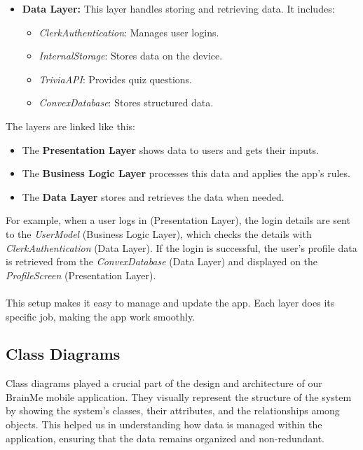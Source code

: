 \begin{itemize}
    \item \textbf{Data Layer:} This layer handles storing and retrieving data. It includes:
    \begin{itemize}
        \item \textit{ClerkAuthentication}: Manages user logins.
        \item \textit{InternalStorage}: Stores data on the device.
        \item \textit{TriviaAPI}: Provides quiz questions.
        \item \textit{ConvexDatabase}: Stores structured data.
    \end{itemize}
\end{itemize}

The layers are linked like this: 

\begin{itemize}
     
    \item The \textbf{Presentation Layer} shows data to users and gets their inputs.
    \item The \textbf{Business Logic Layer} processes this data and applies the app’s rules.
    \item The \textbf{Data Layer} stores and retrieves the data when needed.
\end{itemize}

For example, when a user logs in (Presentation Layer), the login details are sent to the \textit{UserModel} (Business Logic Layer), which checks the details with \textit{ClerkAuthentication} (Data Layer). If the login is successful, the user's profile data is retrieved from the \textit{ConvexDatabase} (Data Layer) and displayed on the \textit{ProfileScreen} (Presentation Layer). \\\\
This setup makes it easy to manage and update the app. Each layer does its specific job, making the app work smoothly.

\subsection{Class Diagrams}

Class diagrams played a crucial part of the design and architecture of our BrainMe mobile application. They visually represent the structure of the system by showing the system's classes, their attributes, and the relationships among objects. This helped us in understanding how data is managed within the application, ensuring that the data remains organized and non-redundant.


